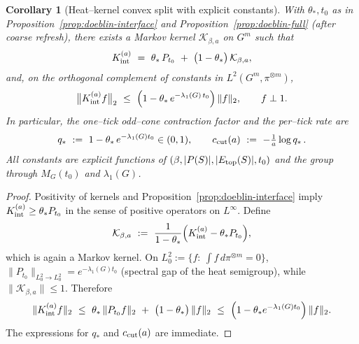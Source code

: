 \documentclass[11pt]{amsart}
\theoremstyle{plain}
\newtheorem{corollary}[theorem]{Corollary}
\theoremstyle{definition}
\theoremstyle{remark}
\renewcommand{\tfrac}[2]{\textstyle\frac{#1}{#2}}
\begin{document}
\begin{corollary}[Heat--kernel convex split with explicit constants]\label{cor:hk-convex-split-explicit}
With $\theta_*,t_0$ as in Proposition~\ref{prop:doeblin-interface} and Proposition~\ref{prop:doeblin-full} (after coarse refresh), there exists a Markov kernel $\mathcal K_{\beta,a}$ on $G^m$ such that
\[
  K_{\rm int}^{(a)}\ =\ \theta_*\,P_{t_0}\ +\ \big(1-\theta_*\big)\,\mathcal K_{\beta,a},
\]
and, on the orthogonal complement of constants in $L^2(G^m,\pi^{\otimes m})$,
\[
  \big\|K_{\rm int}^{(a)} f\big\|_{2}\ \le\ \Big(1-\theta_*\,e^{-\lambda_1(G)\,t_0}\Big)\,\|f\|_{2},\qquad f\perp 1.
\]
In particular, the one--tick odd--cone contraction factor and the per--tick rate are
\[
  q_*\ :=\ 1-\theta_*\,e^{-\lambda_1(G) t_0}\in(0,1),\qquad c_{\rm cut}(a)\ :=\ -\tfrac{1}{a}\log q_*\,.
\]
All constants are explicit functions of $(\beta, |P(S)|, |E_{\rm top}(S)|, t_0)$ and the group through $M_G(t_0)$ and $\lambda_1(G)$.
\end{corollary}
\begin{proof}
Positivity of kernels and Proposition~\ref{prop:doeblin-interface} imply $K_{\rm int}^{(a)}\ge \theta_* P_{t_0}$ in the sense of positive operators on $L^\infty$. Define
\[
  \mathcal K_{\beta,a}\ :=\ \frac{1}{1-\theta_*}\Big(K_{\rm int}^{(a)}-\theta_* P_{t_0}\Big),
\]
which is again a Markov kernel. On $L^2_0:=\{f:\ \int f\,d\pi^{\otimes m}=0\}$, $\|P_{t_0}\|_{L^2_0\to L^2_0}=e^{-\lambda_1(G) t_0}$ (spectral gap of the heat semigroup), while $\|\mathcal K_{\beta,a}\|\le 1$. Therefore
\[
  \|K_{\rm int}^{(a)} f\|_2\ \le\ \theta_*\,\|P_{t_0} f\|_2\ +\ \big(1-\theta_*\big)\,\|f\|_2\ \le\ \Big(1-\theta_* e^{-\lambda_1(G) t_0}\Big)\,\|f\|_2.
\]
The expressions for $q_*$ and $c_{\rm cut}(a)$ are immediate.
\end{proof}
\end{document}
